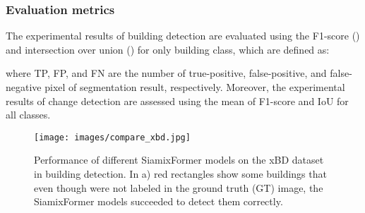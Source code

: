 \documentclass{article}
\begin{document}
\subsubsection{Evaluation metrics}
The experimental results of building detection are evaluated using the F1-score () and intersection over union () for only building class, which are defined as:

where TP, FP, and FN are the number of true-positive, false-positive, and false-negative pixel of segmentation result, respectively. Moreover, the experimental results of change detection are assessed using the mean of F1-score and IoU for all classes.

\begin{figure*}[b!]
	\begin{center}
		\texttt{[image: images/compare\_xbd.jpg]}
		\caption{Performance of different SiamixFormer models on the xBD dataset in building detection. In a) red rectangles show some buildings that even though were not labeled in the ground truth (GT) image, the SiamixFormer models succeeded to detect them correctly.}
		\label{compare_xbd}
	\end{center}
\end{figure*}
\end{document}

